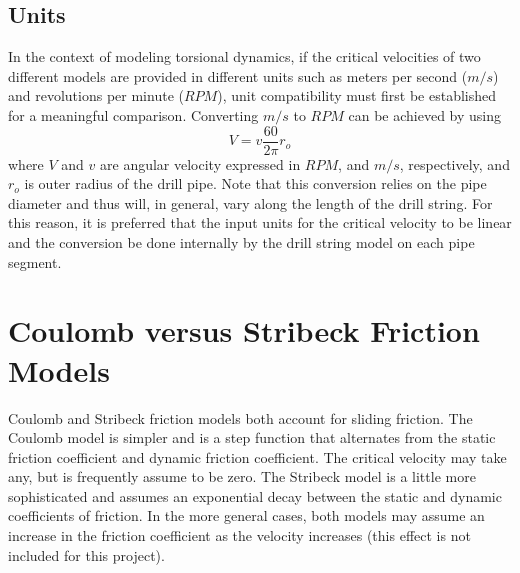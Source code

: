 \subsection{Units}
In the context of modeling torsional dynamics, if the critical velocities of two different models are provided in different units such as meters per second ($m/s$) and revolutions per minute ($RPM$), unit compatibility must first be established for a meaningful comparison. Converting $m/s$ to $RPM$ can be achieved by using
\begin{equation}\label{velocity_conversion}
    V = v\frac{60}{2\pi}r_o
\end{equation}
where $V$ and $v$ are angular velocity expressed in $RPM$, and $m/s$, respectively, and $r_o$ is outer radius of the drill pipe.  Note that this conversion relies on the pipe diameter and thus will, in general, vary along the length of the drill string.  For this reason, it is preferred that the input units for the critical velocity to be linear and the conversion be done internally by the drill string model on each pipe segment.


\section{Coulomb versus Stribeck Friction Models}
Coulomb and Stribeck friction models both account for sliding friction.  The Coulomb model is simpler and is a step function that alternates from the static friction coefficient and dynamic friction coefficient.  The critical velocity may take any, but is frequently assume to be zero.  The Stribeck model is a little more sophisticated and assumes an exponential decay between the static and dynamic coefficients of friction.  In the more general cases, both models may assume an increase in the friction coefficient as the velocity increases (this effect is not included for this project).

